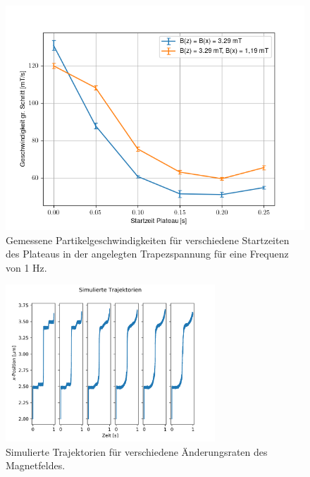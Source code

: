 \documentclass[page,pdftex,12pt,a4paper,twoside,openright]{scrbook}
\begin{document}
\begin{figure}[!h]
\centering
\includegraphics[width=.75\textwidth]{./img/v.png}
\caption{\label{img-v}
Gemessene Partikelgeschwindigkeiten für verschiedene Startzeiten des Plateaus in der angelegten Trapezspannung für eine Frequenz von 1 Hz.}
\end{figure}

\begin{figure}[htbp]
\centering
\includegraphics[width=0.7\textwidth]{./img/sim.png}
\caption{\label{img-traj_real}
Simulierte Trajektorien für verschiedene Änderungsraten des Magnetfeldes.}
\end{figure}
\end{document}
